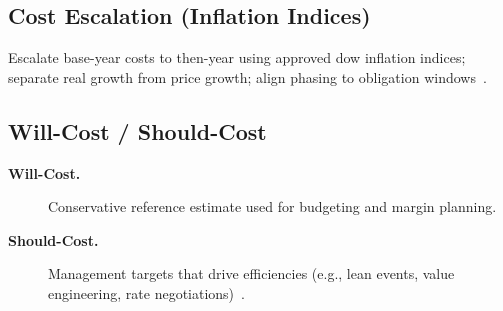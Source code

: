 \documentclass[../main.tex]{subfiles}
\begin{document}
\subsection{Cost Escalation (Inflation Indices)}
Escalate base-year costs to then-year using approved \ac{dow} inflation indices; separate real growth from price growth; align phasing to obligation windows~\autocite{DoDFMR-Vol3}.

\subsection{Will-Cost / Should-Cost}
\begin{description}
	\item[\textbf{Will-Cost.}] Conservative reference estimate used for budgeting and margin planning.
	\item[\textbf{Should-Cost.}] Management targets that drive efficiencies (e.g., lean events, value engineering, rate negotiations)~\autocite{DoDI5000-85}.
\end{description}

\end{document}
